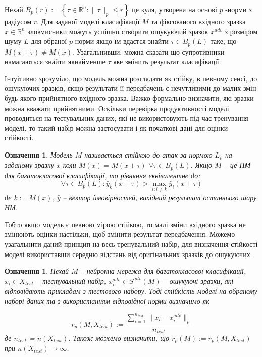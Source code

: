 \documentclass[14pt,a4paper]{extarticle}
\newcounter{e}
\newtheorem{defn}[theorem]{Означення}
\numberwithin{equation}{section}
\numberwithin{figure}{section}
\begin{document}
 Нехай $B_{p}(r):=\left\{\tau \in \mathbb{R}^{n}:\|\tau\|_{p} \leq r\right\}$ це куля, утворена на основі $p$ -норми з радіусом $r$. Для заданої моделі класифікації $M$ та фіксованого вхідного зразка $x \in \mathbb{R}^{n}$ зловмисники можуть успішно створити ошукуючий зразок $x^{adv}$ з розміром шуму $L$ для обраної $p$-норми якщо їм вдастся знайти $\tau \in B_{p}(L)$ таке, що $M(x+\tau) \neq M(x)$. Узагальнивши, можна сказати що супротивники намагаються знайти якнайменше $\tau$ яке змінить результат класифікації.
 
 Інтуітивно зрозуміло, що модель можна розглядати як стійку, в певному сенсі, до ошукуючих зразків, якщо результати її передбачень є нечутливими до малих змін будь-якого прийнятного вхідного зразка. Важко формально визначити, які зразки можна вважати прийнятними. Оскільки перевірка продуктивності моделі проводиться на тестувальних даних, які не використовують під час тренування моделі, то такий набір можна застосувати і як початкові дані для оцінки стійкості.
 
 \begin{defn}
 Модель $M$ називається стійкою до атак за нормою $L_p$ на заданому зразку $x$ коли $M(x)=M(x+\tau)$ $\forall \tau \in B_{p}(L) .$ Якщо $M$ -- це НМ для багатокласової класифікації, то рівняння еквівалентне до:
 \begin{equation}
 \forall \tau \in B_{p}(L): \hat{y}_{k}(x+\tau)>\max _{i: i \neq k} \hat{y}_{i}(x+\tau)
 \end{equation}
 де $k:=M(x)$, $\hat{y}$ -- вектор ймовірностей, вихідний результат останнього шару НМ.
 \end{defn}
 
 Тобто якщо модель є певною мірою стійкою, то малі зміни вхідного зразка не змінюють оцінки настільки, щоб змінити результат передбачення. Можемо узагальнити даний принцип на весь тренувальний набір, для визначення стійкості моделі використавши середню відстань від оригінальних зразків до ошукуючих.
 
 \begin{defn}
 Нехай $M$ -- нейронна мережа для багатокласової класифікації, $x_i \in X_{test}$ -- тестувальний набір, $x^{adv}_i \in S^{adv}(M)$ -- ошукуючі зразки, які відповідають прикладам з тестового набору. Тоді стійкість моделі на обраному наборі даних та з використанням відповідної норми визначимо як
 
 \begin{equation}
 \label{robustness-metric}
 r_p(M, X_{test}) := \frac{\sum\limits^{n_{test}}_{i = 1}\|x_i-x^{adv}_i\|_{p}}{n_{test}}
 \end{equation}
 де $n_{test}$ = $n(X_{test})$. Також можемо визначити, що $r_p(M) := r_p(M, X_{test})$ при $ n(X_{test}) \to \infty$.
 
 \end{defn}
 
\end{document}
